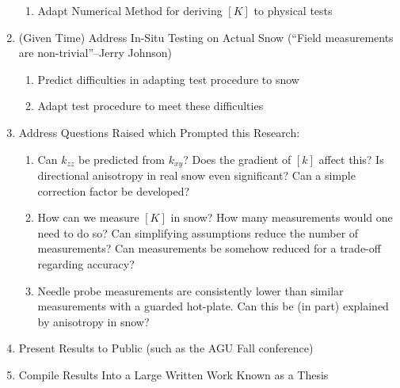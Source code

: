 \documentclass[10pt, letterpaper]{article}
\begin{document}
\begin{enumerate}
\begin{enumerate}
            \item Adapt Numerical Method for deriving \([K]\) to physical tests
        \end{enumerate}
        \item (Given Time) Address In-Situ Testing on Actual Snow (``Field measurements are non-trivial''--Jerry Johnson)
        \begin{enumerate}
            \item Predict difficulties in adapting test procedure to snow
            \item Adapt test procedure to meet these difficulties
        \end{enumerate}
        \item Address Questions Raised which Prompted this Research:
        \begin{enumerate}
            \item Can \(k_{zz}\) be predicted from \(k_{xy}\)? Does the gradient of \([k]\) affect this? Is directional anisotropy in real snow even significant? Can a simple correction factor be developed?
            \item How can we measure \([K]\) in snow? How many measurements would one need to do so? Can simplifying assumptions reduce the number of measurements? Can measurements be somehow reduced for a trade-off regarding accuracy?
            \item Needle probe measurements are consistently lower than similar measurements with a guarded hot-plate. Can this be (in part) explained by anisotropy in snow?
        \end{enumerate}
        \item Present Results to Public (such as the AGU Fall conference)
        \item Compile Results Into a Large Written Work Known as a Thesis
    \end{enumerate}
\end{document}
